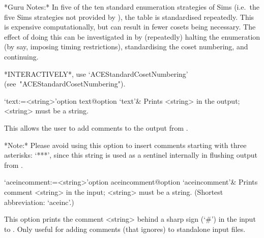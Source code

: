 *Guru Notes:*
In  five  of  the  ten  standard  enumeration   strategies   of   Sims
\cite{Sim94} (i.e.~the five Sims strategies not provided  by  {\ACE}),
the   table   is   standardised   repeatedly.   This   is    expensive
computationally, but can result in fewer cosets being  necessary.  The
effect of doing this can be investigated  in  {\ACE}  by  (repeatedly)
halting  the  enumeration  (by  say,  imposing  timing  restrictions),
standardising the coset numbering, and continuing.

*INTERACTIVELY*,            use            `ACEStandardCosetNumbering'
(see~"ACEStandardCosetNumbering").

\enditems


\beginitems

\>`text:=<string>'{option text}@{option `text'}&
Prints <string> in the output; <string> must be a string.

This allows the user to add comments to the output from {\ACE}.

*Note:*
Please avoid using this option to insert comments starting with  three
asterisks: `***', since this string is used as a  sentinel  internally
in flushing output from {\ACE}.

\>`aceincomment:=<string>'{option aceincomment}@{option `aceincomment'}&
Prints comment <string> in the {\ACE} input; <string> must be a string.
(Shortest abbreviation: `aceinc'.)

This option prints the comment <string> behind a sharp sign (`\#')  in
the input to {\ACE}. Only useful  for  adding  comments  (that  {\ACE}
ignores) to standalone input files.

\enditems

